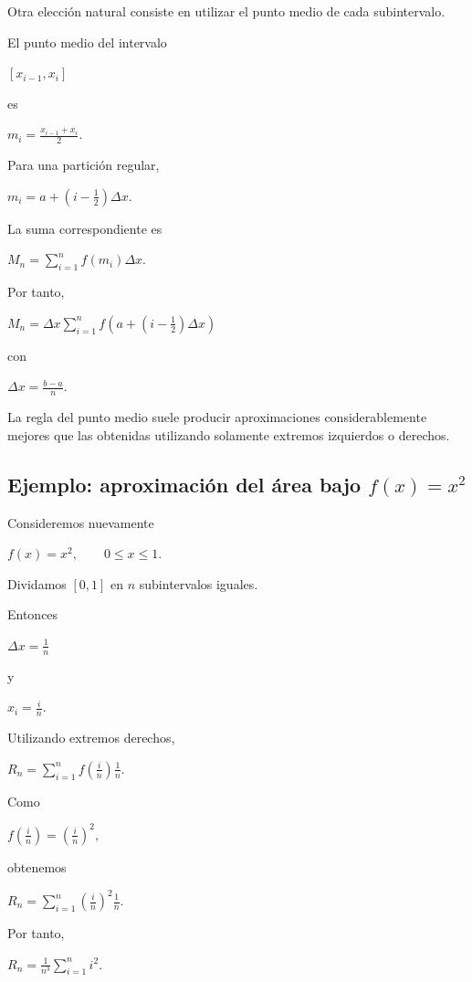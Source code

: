 \documentclass[12pt]{article}
\begin{document}
Otra elección natural consiste en utilizar el punto medio de cada
subintervalo.

El punto medio del intervalo

$
[x_{i-1},x_i]
$

es

$
m_i
=
\frac{x_{i-1}+x_i}{2}.
$

Para una partición regular,

$
m_i
=
a+\left(i-\frac{1}{2}\right)\Delta x.
$

La suma correspondiente es

$
M_n
=
\sum_{i=1}^{n}
f(m_i)\Delta x.
$

Por tanto,

$
\boxed{
M_n
=
\Delta x
\sum_{i=1}^{n}
f\left(
a+\left(i-\frac{1}{2}\right)\Delta x
\right)
}
$

con

$
\Delta x=\frac{b-a}{n}.
$

La regla del punto medio suele producir aproximaciones considerablemente
mejores que las obtenidas utilizando solamente extremos izquierdos o
derechos.

\subsection*{Ejemplo: aproximación del área bajo $f(x)=x^2$}

Consideremos nuevamente

$
f(x)=x^2,
\qquad
0\leq x\leq1.
$

Dividamos $[0,1]$ en $n$ subintervalos iguales.

Entonces

$
\Delta x=\frac{1}{n}
$

y

$
x_i=\frac{i}{n}.
$

Utilizando extremos derechos,

$
R_n
=
\sum_{i=1}^{n}
f\left(\frac{i}{n}\right)\frac{1}{n}.
$

Como

$
f\left(\frac{i}{n}\right)
=
\left(\frac{i}{n}\right)^2,
$

obtenemos

$
R_n
=
\sum_{i=1}^{n}
\left(\frac{i}{n}\right)^2
\frac{1}{n}.
$

Por tanto,

$
R_n
=
\frac{1}{n^3}
\sum_{i=1}^{n}i^2.
$
\end{document}
